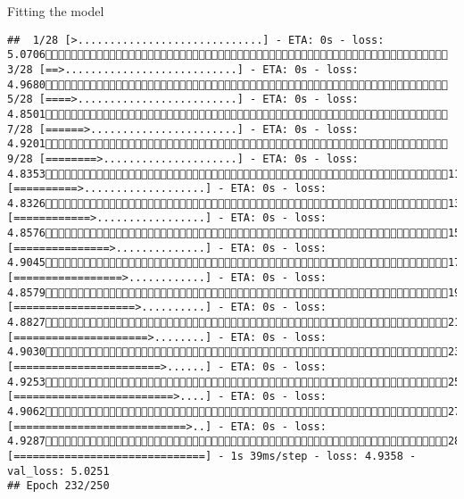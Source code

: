 \documentclass[
  ignorenonframetext,
]{beamer}
\begin{document}
\begin{frame}[fragile]{Fitting the model}
\begin{verbatim}
##  1/28 [>.............................] - ETA: 0s - loss: 5.0706 3/28 [==>...........................] - ETA: 0s - loss: 4.9680 5/28 [====>.........................] - ETA: 0s - loss: 4.8501 7/28 [======>.......................] - ETA: 0s - loss: 4.9201 9/28 [========>.....................] - ETA: 0s - loss: 4.835311/28 [==========>...................] - ETA: 0s - loss: 4.832613/28 [============>.................] - ETA: 0s - loss: 4.857615/28 [===============>..............] - ETA: 0s - loss: 4.904517/28 [=================>............] - ETA: 0s - loss: 4.857919/28 [===================>..........] - ETA: 0s - loss: 4.882721/28 [=====================>........] - ETA: 0s - loss: 4.903023/28 [=======================>......] - ETA: 0s - loss: 4.925325/28 [=========================>....] - ETA: 0s - loss: 4.906227/28 [===========================>..] - ETA: 0s - loss: 4.928728/28 [==============================] - 1s 39ms/step - loss: 4.9358 - val_loss: 5.0251
## Epoch 232/250

\end{verbatim}
\end{frame}
\end{document}
